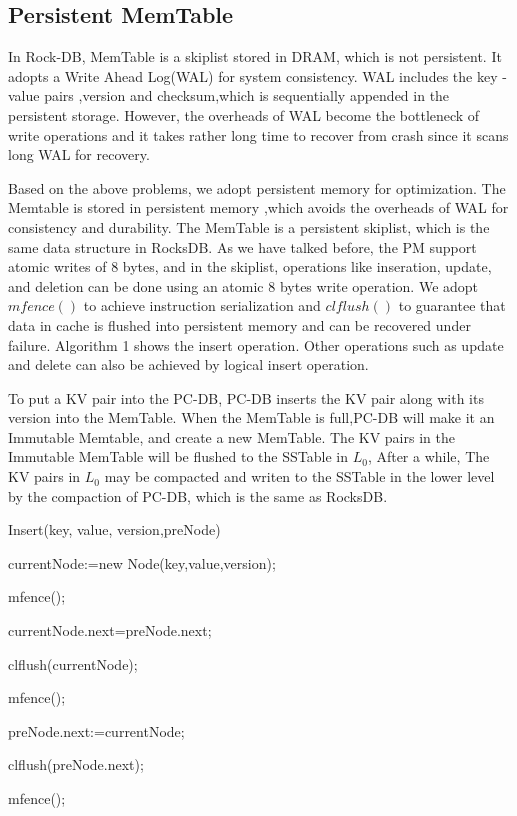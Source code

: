\subsection{Persistent MemTable}
In Rock-DB, MemTable is a skiplist stored in DRAM, which is not persistent. 
It adopts a Write Ahead Log(WAL) for system consistency.
WAL includes the key -value pairs ,version and checksum,which is sequentially appended in the persistent storage. 
However, the overheads of WAL become the bottleneck of write operations and it takes rather long time to recover from crash since it scans long WAL for recovery.

Based on the above problems, we adopt persistent memory for optimization. 
The Memtable is stored in persistent memory ,which avoids the overheads of WAL for consistency and durability. 
The MemTable is a persistent skiplist, which is the same data structure in  RocksDB. As we have talked before, the PM support atomic writes of 8 bytes, and in the skiplist, operations like inseration, update, and deletion can be done using an atomic 8 bytes write operation.
We adopt  $mfence()$ to achieve instruction serialization and $clflush()$ to guarantee that data in cache is flushed into persistent memory and can be recovered under failure. 
Algorithm 1 shows the insert operation. Other operations such as update and delete can also be achieved by logical insert operation.

To put a KV pair into the PC-DB, PC-DB inserts the KV pair along with its version into the MemTable. When the MemTable is full,PC-DB will make it an Immutable Memtable, and create a new MemTable. The KV pairs in the Immutable MemTable will be flushed to the SSTable in $L_0$, 
After a while, The KV pairs in $L_0$ may be compacted and writen to the SSTable in the lower level by the compaction of PC-DB, which is the same as RocksDB.


\begin{algorithm}[t]
\caption{Insert(key, value, version,preNode)} %


currentNode:=new Node(key,value,version);

mfence();

currentNode.next=preNode.next;

clflush(currentNode);

mfence();

preNode.next:=currentNode;

clflush(preNode.next);

mfence();

\end{algorithm}

